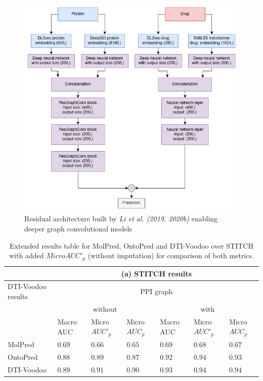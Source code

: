 \documentclass[]{article}
\newcommand{\name}{DTI-Voodoo}
\begin{document}
\clearpage
\begin{figure}[ht]%
	\centerline{\includegraphics[width=1\columnwidth]{../figures/full_model_all_layers.png}}
	\caption{Residual architecture built by \textit{Li et al. (2019, 2020b)} enabling deeper graph convolutional models}
	\label{fig:FullModelAllLayers}
\end{figure}

\clearpage

\begin{table}[ht]
	\centering
	\begin{tabular}{|p{2.0cm}|p{0.8cm}|p{0.8cm}|p{0.8cm}|p{0.8cm}|p{0.8cm}|p{0.8cm}|}
		\hline
		&\multicolumn{6}{c|}{(a) STITCH results}\\
		\hline
		\name{} results&\multicolumn{6}{c|}{PPI graph}\\
		&\multicolumn{3}{c|}{without}&\multicolumn{3}{c|}{with}\\
		&Macro AUC&Micro $AUC'_p$&Micro $AUC_p$&Macro AUC&Micro $AUC'_p$&Micro $AUC_p$\\
		\hline
		MolPred&$0.69$&$0.66$&$0.65$&$0.69$&$0.68$&$0.67$\\
		\hline
		OntoPred&$0.88$&$0.89$&$0.87$&$0.92$&$0.94$&$0.93$\\
		\hline
		\name{} & $0.89$& $0.91$ & $0.90$&$0.93$&$0.94$&$0.94$\\
		\hline
	\end{tabular}
	\caption{Extended results table for MolPred, OntoPred and
          \name{} over STITCH with added $MicroAUC'_p$ (without
          imputation) for comparison of both metrics.}
\end{table}
\end{document}
